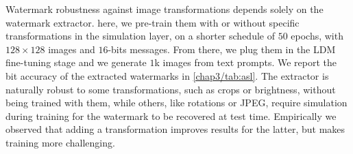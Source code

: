 Watermark robustness against image transformations depends solely on the watermark extractor.
here, we pre-train them with or without specific transformations in the simulation layer, on a shorter schedule of $50$ epochs, with $128\times 128$ images and $16$-bits messages.
From there, we plug them in the LDM fine-tuning stage and we generate $1$k images from text prompts.
We report the bit accuracy of the extracted watermarks in \autoref{chap3/tab:asl}.
The extractor is naturally robust to some transformations, such as crops or brightness, without being trained with them, while others, like rotations or JPEG, require simulation during training for the watermark to be recovered at test time.
Empirically we observed that adding a transformation improves results for the latter, but makes training more challenging.
















































